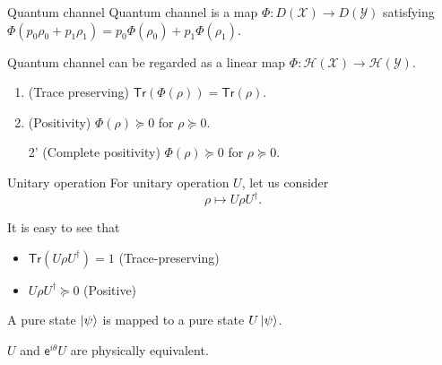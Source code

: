 \documentclass{beamer}
\newcommand{\Tr}{\mathsf{Tr}}
\newcommand\emm[1]{\textcolor{redorange}{{#1}}}
\begin{document}
\begin{frame}{Quantum channel}
Quantum channel is a map $\Phi\colon D(\mathcal{X})\to D(\mathcal{Y})$ satisfying $\Phi(p_0 \rho_0 + p_1 \rho_1) = p_0\Phi(\rho_0) + p_1\Phi(\rho_1)$.

\vspace{2em}
Quantum channel can be regarded as a \emm{linear map} $\Phi\colon\mathcal{H}(\mathcal{X})\to \mathcal{H}(\mathcal{Y})$.

\begin{enumerate}
\item (Trace preserving) $\Tr(\Phi(\rho)) = \Tr(\rho)$.
\item (Positivity) $\Phi(\rho)\succeq 0$ for $\rho\succeq 0$.
\end{enumerate}

\begin{enumerate}
\item[2'] (Complete positivity) $\Phi(\rho)\succeq 0$ for $\rho\succeq 0$.
\end{enumerate}
\end{frame}
\fi


\begin{frame}{Unitary operation}
For \emm{unitary} operation $U$, let us consider
\begin{equation*}
\rho\mapsto U\rho U^\dagger.
\end{equation*}

\vspace{2em}
It is easy to see that
\begin{itemize}
\item $\Tr(U\rho U^\dagger)=1$ (Trace-preserving)
\item $U\rho U^\dagger\succeq 0$ (Positive)
\end{itemize}

\vspace{3em}
A pure state $\ket{\psi}$ is mapped to a pure state $U\ket{\psi}$.

\vspace{2em}
$U$ and $\mathsf{e}^{i\theta}U$ are physically equivalent.
\end{frame}
\end{document}
